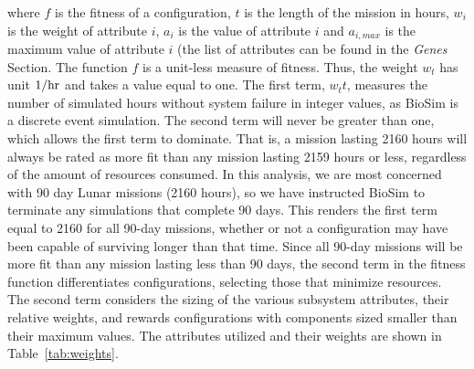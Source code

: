 \documentclass[submit]{aiaa}
\begin{document}
\noindent where $f$ is the fitness of a configuration,
$t$ is the length of the mission in hours, $w_i$ is the weight of attribute
$i$, $a_i$ is the value of attribute $i$ and $a_{i,max}$ is the
maximum value of attribute $i$ (the list of attributes can be found in the \emph{Genes} Section. %
The function $f$ is a unit-less measure
of fitness.
Thus, the weight $w_t$ has unit $1/{\rm hr}$ and takes a
value equal to one. 
The first term, $w_tt$, measures the number of simulated hours without system failure in integer values, as BioSim is a
discrete event simulation. The second term will never be greater than
one, which allows the first term to dominate.  
That is, a mission lasting 2160 hours will always be rated as more fit than any mission lasting 2159 hours or less, regardless of the amount of resources consumed.  
In this analysis, we are most concerned with 90 day Lunar
missions (2160 hours), so we have instructed BioSim to terminate any
simulations that complete 90 days.  
This renders the first term equal to 2160 for all 90-day missions, whether or not a configuration may have been capable of surviving longer than that time. 
Since all 90-day missions will be more fit than any mission lasting less than 90 days, the second term in the fitness function differentiates configurations, selecting those that minimize resources.  
The second term considers the sizing of the various subsystem attributes, their
relative weights, and rewards configurations with components sized
smaller than their maximum values.  The attributes utilized and their
weights are shown in Table~\ref{tab:weights}.
\end{document}
